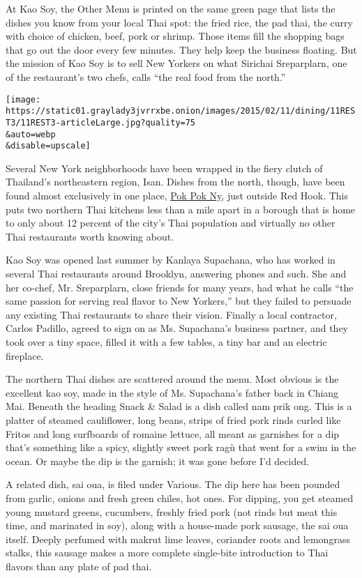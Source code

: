 At Kao Soy, the Other Menu is printed on the same green page that lists
the dishes you know from your local Thai spot: the fried rice, the pad
thai, the curry with choice of chicken, beef, pork or shrimp. Those
items fill the shopping bags that go out the door every few minutes.
They help keep the business floating. But the mission of Kao Soy is to
sell New Yorkers on what Sirichai Sreparplarn, one of the restaurant's
two chefs, calls ``the real food from the north.''

\texttt{[image: https://static01.graylady3jvrrxbe.onion/images/2015/02/11/dining/11REST3/11REST3-articleLarge.jpg?quality=75\\\&auto=webp\\\&disable=upscale]}

Several New York neighborhoods have been wrapped in the fiery clutch of
Thailand's northeastern region, Isan. Dishes from the north, though,
have been found almost exclusively in one place,
\href{http://www.nytimes3xbfgragh.onion/2012/06/27/dining/reviews/pok-pok-ny-brooklyn-restaurant-review.html}{Pok
Pok Ny}, just outside Red Hook. This puts two northern Thai kitchens
less than a mile apart in a borough that is home to only about 12
percent of the city's Thai population and virtually no other Thai
restaurants worth knowing about.

Kao Soy was opened last summer by Kanlaya Supachana, who has worked in
several Thai restaurants around Brooklyn, answering phones and such. She
and her co-chef, Mr. Sreparplarn, close friends for many years, had what
he calls ``the same passion for serving real flavor to New Yorkers,''
but they failed to persuade any existing Thai restaurants to share their
vision. Finally a local contractor, Carlos Padillo, agreed to sign on as
Ms. Supachana's business partner, and they took over a tiny space,
filled it with a few tables, a tiny bar and an electric fireplace.

The northern Thai dishes are scattered around the menu. Most obvious is
the excellent kao soy, made in the style of Ms. Supachana's father back
in Chiang Mai. Beneath the heading Snack \& Salad is a dish called nam
prik ong. This is a platter of steamed cauliflower, long beans, strips
of fried pork rinds curled like Fritos and long surfboards of romaine
lettuce, all meant as garnishes for a dip that's something like a spicy,
slightly sweet pork ragù that went for a swim in the ocean. Or maybe the
dip is the garnish; it was gone before I'd decided.

A related dish, sai oua, is filed under Various. The dip here has been
pounded from garlic, onions and fresh green chiles, hot ones. For
dipping, you get steamed young mustard greens, cucumbers, freshly fried
pork (not rinds but meat this time, and marinated in soy), along with a
house-made pork sausage, the sai oua itself. Deeply perfumed with makrut
lime leaves, coriander roots and lemongrass stalks, this sausage makes a
more complete single-bite introduction to Thai flavors than any plate of
pad thai.

